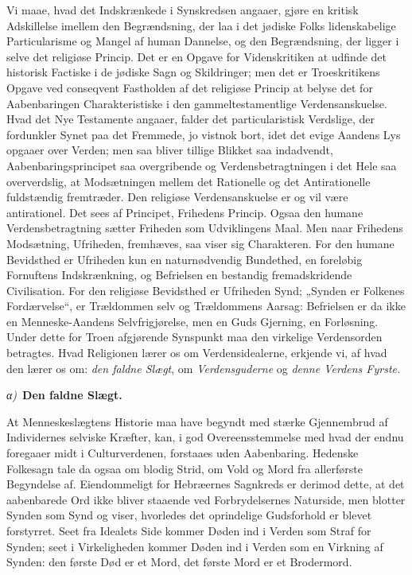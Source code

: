 \documentclass[12pt]{book}
\newcommand{\greekrun}[2]{%
  \medskip\begin{center}{\itshape #1)}\ {\bfseries #2}\end{center}\medskip}
\begin{document}
Vi maae, hvad det Indskrænkede i Synskredsen angaaer, gjøre en
kritisk Adskillelse imellem den Begrændsning, der laa i det jødiske
Folks lidenskabelige Particularisme og Mangel af human Dannelse, og
den Begrændsning, der ligger i selve det religiøse Princip. Det er
en Opgave for Videnskritiken at udfinde det historisk Factiske i de
jødiske Sagn og Skildringer; men det er Troeskritikens Opgave ved
conseqvent Fastholden af det religiøse Princip at belyse det for
Aabenbaringen Charakteristiske i den gammeltestamentlige
Verdensanskuelse. Hvad det Nye Testamente angaaer, falder det
particularistisk Verdslige, der fordunkler Synet paa det Fremmede,
jo vistnok bort, idet det evige Aandens Lys opgaaer over Verden; men
saa bliver tillige Blikket saa indadvendt, Aabenbaringsprincipet saa
overgribende og Verdensbetragtningen i det Hele saa oververdslig, at
Modsætningen mellem det Rationelle og det Antirationelle fuldstændig
fremtræder.
Den religiøse Verdensanskuelse er og vil være antirationel. Det sees
af Principet, Frihedens Princip. Ogsaa den humane
Verdensbetragtning sætter Friheden som Udviklingens Maal. Men naar
Frihedens Modsætning, Ufriheden, fremhæves, saa viser sig
Charakteren. For den humane Bevidsthed er Ufriheden kun en
naturnødvendig Bundethed, en foreløbig Fornuftens Indskrænkning, og
Befrielsen en bestandig fremadskridende Civilisation. For den
religiøse Bevidsthed er Ufriheden Synd; „Synden er Folkenes
Fordærvelse“, er Trældommen selv og Trældommens Aarsag: Befrielsen
er da ikke en Menneske-Aandens Selvfrigjørelse, men en Guds
Gjerning, en Forløsning. Under dette for Troen afgjørende Synspunkt
maa den virkelige Verdensorden betragtes. Hvad Religionen lærer os
om Verdensidealerne, erkjende vi, af hvad den lærer os om: \emph{den
faldne Slægt}, om \emph{Verdensguderne} og \emph{denne Verdens
Fyrste.}

\greekrun{α}{Den faldne Slægt.}

At Menneskeslægtens Historie maa have begyndt med stærke
Gjennembrud af Individernes selviske Kræfter, kan, i god
Overeensstemmelse med hvad der endnu foregaaer midt i Culturverdenen,
forstaaes uden Aabenbaring. Hedenske Folkesagn tale da ogsaa om
blodig Strid, om Vold og Mord fra allerførste Begyndelse af.
Eiendommeligt for Hebræernes Sagnkreds er derimod dette, at det
aabenbarede Ord ikke bliver staaende ved Forbrydelsernes Naturside,
men blotter Synden som Synd og viser, hvorledes det oprindelige
Gudsforhold er blevet forstyrret. Seet fra Idealets Side kommer
Døden ind i Verden som Straf for Synden; seet i Virkeligheden kommer
Døden ind i Verden som en Virkning af Synden: den første Død er et
Mord, det første Mord er et Brodermord.
\end{document}
